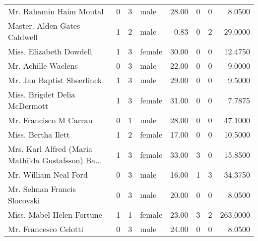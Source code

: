 \begin{tabular}{lrrlrrrr}
Mr. Rahamin Haim Moutal                            &         0 &       3 &    male &  28.00 &                        0 &                        0 &    8.0500 \\
Master. Alden Gates Caldwell                       &         1 &       2 &    male &   0.83 &                        0 &                        2 &   29.0000 \\
Miss. Elizabeth Dowdell                            &         1 &       3 &  female &  30.00 &                        0 &                        0 &   12.4750 \\
Mr. Achille Waelens                                &         0 &       3 &    male &  22.00 &                        0 &                        0 &    9.0000 \\
Mr. Jan Baptist Sheerlinck                         &         1 &       3 &    male &  29.00 &                        0 &                        0 &    9.5000 \\
Miss. Brigdet Delia McDermott                      &         1 &       3 &  female &  31.00 &                        0 &                        0 &    7.7875 \\
Mr. Francisco M Carrau                             &         0 &       1 &    male &  28.00 &                        0 &                        0 &   47.1000 \\
Miss. Bertha Ilett                                 &         1 &       2 &  female &  17.00 &                        0 &                        0 &   10.5000 \\
Mrs. Karl Alfred (Maria Mathilda Gustafsson) Ba... &         1 &       3 &  female &  33.00 &                        3 &                        0 &   15.8500 \\
Mr. William Neal Ford                              &         0 &       3 &    male &  16.00 &                        1 &                        3 &   34.3750 \\
Mr. Selman Francis Slocovski                       &         0 &       3 &    male &  20.00 &                        0 &                        0 &    8.0500 \\
Miss. Mabel Helen Fortune                          &         1 &       1 &  female &  23.00 &                        3 &                        2 &  263.0000 \\
Mr. Francesco Celotti                              &         0 &       3 &    male &  24.00 &                        0 &                        0 &    8.0500 \\

\end{tabular}
